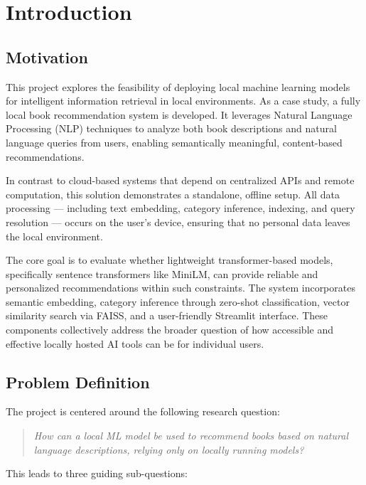 \chapter{Introduction}
\label{chapter:introduction}

\section{Motivation}
\label{sec:motivation}

This project explores the feasibility of deploying local machine learning models for intelligent information retrieval in local environments. 
As a case study, a fully local book recommendation system is developed. 
It leverages Natural Language Processing (NLP) techniques to analyze both book descriptions and natural language queries from users, enabling semantically meaningful, content-based recommendations.

In contrast to cloud-based systems that depend on centralized APIs and remote computation, this solution demonstrates a standalone, offline setup. 
All data processing — including text embedding, category inference, indexing, and query resolution — occurs on the user’s device, ensuring that no personal data leaves the local environment.

The core goal is to evaluate whether lightweight transformer-based models, specifically sentence transformers like MiniLM, can provide reliable and personalized recommendations within such constraints. 
The system incorporates semantic embedding, category inference through zero-shot classification, vector similarity search via FAISS, and a user-friendly Streamlit interface. 
These components collectively address the broader question of how accessible and effective locally hosted AI tools can be for individual users.

\section{Problem Definition}
\label{sec:problem-definition}

The project is centered around the following research question:

\begin{quote}
\textit{How can a local ML model be used to recommend books based on natural language descriptions, relying only on locally running models?}
\end{quote}

This leads to three guiding sub-questions:

